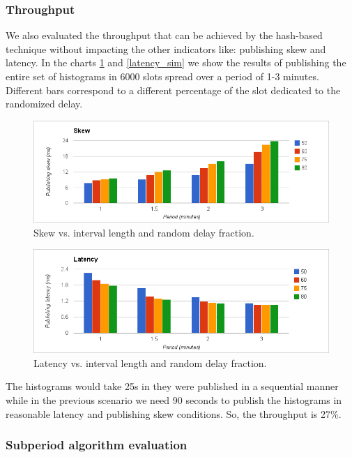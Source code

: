 \subsubsection*{Throughput}

We also evaluated the throughput that can be achieved by the hash-based technique without impacting the other indicators like: publishing skew and latency. In the charts \ref{fig:skew_sim} and \ref{latency_sim} we show the results of publishing the entire set of histograms in 6000 slots spread over a period of 1-3 minutes. Different bars correspond to a different percentage of the slot dedicated to the randomized delay.

\begin{figure}[ht]
\centering
\includegraphics[scale=0.5]{Images/skew_sim.png}
\caption{Skew vs. interval length and random delay fraction.}
\label{fig:skew_sim}
\end{figure}

\begin{figure}[ht]
\centering
\includegraphics[scale=0.5]{Images/latency_sim.png}
\caption{Latency vs. interval length and random delay fraction.}
\label{fig:latency_sim}
\end{figure}

The histograms would take 25s in they were published in a sequential manner while in the previous scenario we need 90 seconds to publish the histograms in reasonable latency and publishing skew conditions. So, the throughput is 27\%.


\subsubsection*{Subperiod algorithm evaluation}

